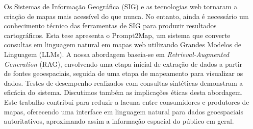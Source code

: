 
%

Os Sistemas de Informação Geográfica (SIG) e as tecnologias web tornaram a criação de mapas mais acessível do que nunca. No entanto, ainda é necessário um conhecimento técnico das ferramentas de SIG para produzir resultados cartográficos.
Esta tese apresenta o Prompt2Map, um sistema que converte consultas em linguagem natural em mapas web utilizando Grandes Modelos de Linguagem (LLMs).
A nossa abordagem baseia-se em \textit{Retrieval-Augmented Generation} (RAG), envolvendo uma etapa inicial de extração de dados a partir de fontes geoespaciais, seguida de uma etapa de mapeamento para visualizar os dados.
Testes de desempenho realizados com consultas sintéticas demonstram a eficácia do sistema.
Discutimos também as implicações éticas desta abordagem.
Este trabalho contribui para reduzir a lacuna entre consumidores e produtores de mapas, oferecendo uma interface em linguagem natural para dados geoespaciais autoritativos, aproximando assim a informação espacial do público em geral.


